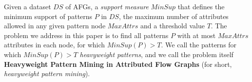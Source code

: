 Given a dataset $DS$ of AFGs, a \emph{support measure} $MinSup$ that defines the minimum support of patterns $P$ in $DS$, the maximum number of attributes allowed in any given pattern node $MaxAttrs$ and a threshold value $T$. The problem we address in this paper is to find all patterns $P$ with at most $MaxAttrs$ attributes in each node, for which $MinSup(P) > T$. We call the patterns for which $MinSup(P) > T$ \emph{heavyweight patterns}, and we call the problem itself {\bf Heavyweight Pattern Mining in Attributed Flow Graphs} (for short, \emph{heavyweight pattern mining}).


